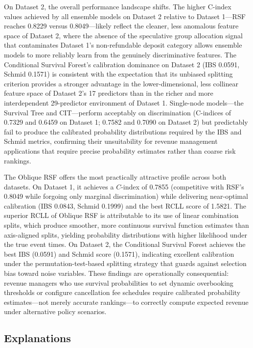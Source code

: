 \documentclass[pdflatex,sn-mathphys-ay]{sn-jnl}
\theoremstyle{thmstyleone}%
\theoremstyle{thmstyletwo}%
\theoremstyle{thmstylethree}%
\begin{document}
On Dataset 2, the overall performance landscape shifts. The higher C-index values achieved by all ensemble models on Dataset 2 relative to Dataset 1—RSF reaches 0.8229 versus 0.8049—likely reflect the cleaner, less anomalous feature space of Dataset 2, where the absence of the speculative group allocation signal that contaminates Dataset 1's non-refundable deposit category allows ensemble models to more reliably learn from the genuinely discriminative features. The Conditional Survival Forest's calibration dominance on Dataset 2 (IBS 0.0591, Schmid 0.1571) is consistent with the expectation that its unbiased splitting criterion provides a stronger advantage in the lower-dimensional, less collinear feature space of Dataset 2's 17 predictors than in the richer and more interdependent 29-predictor environment of Dataset 1. Single-node models—the Survival Tree and CIT—perform acceptably on discrimination (C-indices of 0.7329 and 0.6459 on Dataset 1; 0.7582 and 0.7090 on Dataset 2) but predictably fail to produce the calibrated probability distributions required by the IBS and Schmid metrics, confirming their unsuitability for revenue management applications that require precise probability estimates rather than coarse risk rankings.

The Oblique RSF offers the most practically attractive profile across both datasets. On Dataset 1, it achieves a $C$-index of 0.7855 (competitive with RSF's 0.8049 while forgoing only marginal discrimination) while delivering near-optimal calibration (IBS 0.0843, Schmid 0.1999) and the best RCLL score of 1.5821. The superior RCLL of Oblique RSF is attributable to its use of linear combination splits, which produce smoother, more continuous survival function estimates than axis-aligned splits, yielding probability distributions with higher likelihood under the true event times. On Dataset 2, the Conditional Survival Forest achieves the best IBS (0.0591) and Schmid score (0.1571), indicating excellent calibration under the permutation-test-based splitting strategy that guards against selection bias toward noise variables. These findings are operationally consequential: revenue managers who use survival probabilities to set dynamic overbooking thresholds or configure cancellation fee schedules require calibrated probability estimates—not merely accurate rankings—to correctly compute expected revenue under alternative policy scenarios.

\subsection{Explanations}
\label{sec:explanations}
\end{document}

